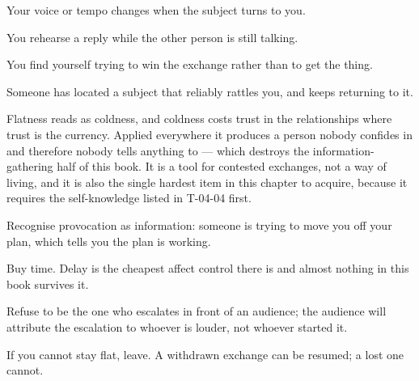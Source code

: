 \begin{feedback}
  \item Your voice or tempo changes when the subject turns to you.
  \item You rehearse a reply while the other person is still talking.
  \item You find yourself trying to win the exchange rather than to get the thing.
  \item Someone has located a subject that reliably rattles you, and keeps returning to it.
\end{feedback}

\begin{failure}
Flatness reads as coldness, and coldness costs trust in the relationships where trust is the currency. Applied everywhere it produces a person nobody confides in and therefore nobody tells anything to --- which destroys the information-gathering half of this book. It is a tool for contested exchanges, not a way of living, and it is also the single hardest item in this chapter to acquire, because it requires the self-knowledge listed in T-04-04 first.
\end{failure}

\begin{countermeasures}
  \item Recognise provocation as information: someone is trying to move you off your plan, which tells you the plan is working.
  \item Buy time. Delay is the cheapest affect control there is and almost nothing in this book survives it.
  \item Refuse to be the one who escalates in front of an audience; the audience will attribute the escalation to whoever is louder, not whoever started it.
  \item If you cannot stay flat, leave. A withdrawn exchange can be resumed; a lost one cannot.
\end{countermeasures}

\seesources
{}
